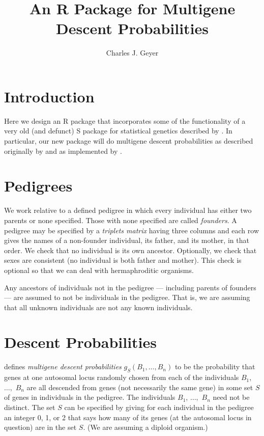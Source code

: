 \documentclass[11pt]{article}
\begin{document}
\title{An R Package for Multigene Descent Probabilities}

\author{Charles J. Geyer}

\maketitle

\section{Introduction}

Here we design an R package that incorporates some of the functionality
of a very old (and defunct) S package for statistical genetics described
by \citet{geyer}.  In particular, our new package will do multigene
descent probabilities as described originally by \citet{thompson} and
as implemented by \citet{geyer}.

\section{Pedigrees}

We work relative to a defined pedigree in which every individual has either
two parents or none specified.  Those with none specified are called
\emph{founders}.  A pedigree may be specified by a \emph{triplets matrix}
having three columns and each row gives the names of a non-founder individual,
its father, and its mother, in that order.  We check that no individual is
its own ancestor.  Optionally, we check that sexes are consistent
(no individual is both father and mother).  This check is optional
so that we can deal with hermaphroditic organisms.

Any ancestors of individuals not in the pedigree --- including parents
of founders --- are assumed to not be individuals in the pedigree.
That is, we are assuming that all unknown individuals are not any known
individuals.

\section{Descent Probabilities}

\citet{thompson} defines \emph{multigene descent probabilities}
$g_S(B_1, \ldots, B_n)$ to be the probability that genes
at one autosomal locus randomly chosen from
each of the individuals $B_1$, $\ldots,$ $B_n$
are all descended from genes (not necessarily the same gene)
in some set $S$ of genes in individuals in the pedigree.
The individuals $B_1$, $\ldots,$ $B_n$ need not be distinct.
The set $S$ can be specified by giving for each individual in the pedigree
an integer 0, 1, or 2 that says how many of its genes (at the autosomal locus
in question) are in the set $S$.  (We are assuming a diploid organism.)
\end{document}
